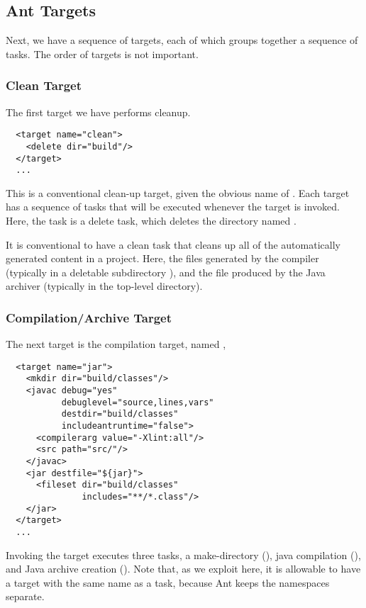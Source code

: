 \subsection{Ant Targets}

Next, we have a sequence of targets, each of which groups together
a sequence of tasks.  The order of targets is not important.  

\subsubsection{Clean Target}

The first target we have performs cleanup.
%
\begin{verbatim}
  <target name="clean">
    <delete dir="build"/>
  </target>
  ...
\end{verbatim}
%
This is a conventional clean-up target, given the obvious name of
.  Each target has a sequence of tasks that will be
executed whenever the target is invoked.  Here, the task
is a delete task, which deletes the directory named .

It is conventional to have a clean task that cleans up all of the
automatically generated content in a project.  Here, the 
files generated by the compiler (typically in a deletable subdirectory
), and the  file produced by the Java archiver
(typically in the top-level directory).

\subsubsection{Compilation/Archive Target}

The next target is the compilation target, named ,

\begin{verbatim}
  <target name="jar">
    <mkdir dir="build/classes"/>
    <javac debug="yes"
           debuglevel="source,lines,vars"
           destdir="build/classes"
           includeantruntime="false">
      <compilerarg value="-Xlint:all"/>
      <src path="src/"/>
    </javac>
    <jar destfile="${jar}">
      <fileset dir="build/classes"
               includes="**/*.class"/>
    </jar>
  </target>
  ...
\end{verbatim}
%
Invoking the  target executes three tasks, a make-directory
(), java compilation (), and Java archive
creation ().  Note that, as we exploit here, it is
allowable to have a target with the same name as a task, because Ant
keeps the namespaces separate.

